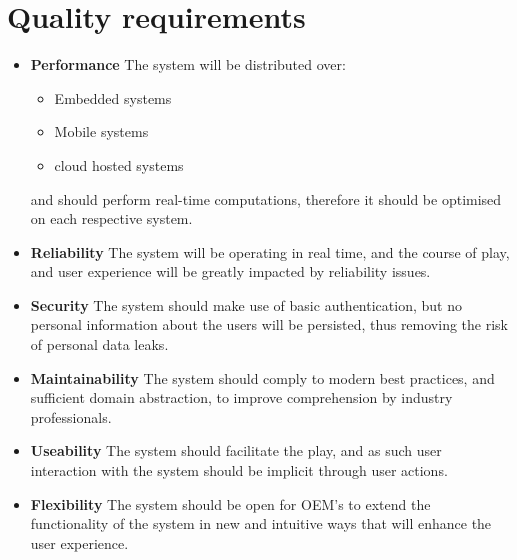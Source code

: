 \section{Quality requirements}
\begin{itemize}
\item \textbf{Performance}
    \newline
    The system will be distributed over:
    \begin{itemize}
        \item Embedded systems
        \item Mobile systems
        \item cloud hosted systems
    \end{itemize}
    and should perform real-time computations, therefore it should be optimised on each respective system.
    \newline
\item \textbf{Reliability}
    \newline
    The system will be operating in real time, and the course of play, and user experience will be greatly impacted by reliability issues.
    \newline
\item \textbf{Security}
    \newline
    The system should make use of basic authentication, but no personal information about the users will be persisted, thus removing the risk of personal data leaks.
    \newline
\item \textbf{Maintainability}
    \newline
    The system should comply to modern best practices, and sufficient domain abstraction, to improve comprehension by industry professionals.
    \newline
\item \textbf{Useability}
    \newline
    The system should facilitate the play, and as such user interaction with the system should be implicit through user actions.
    \newline
\item \textbf{Flexibility}
    \newline
    The system should be open for OEM's to extend the functionality of the system in new and intuitive ways that will enhance the user experience.
    \newline
\end{itemize}
\pagebreak


